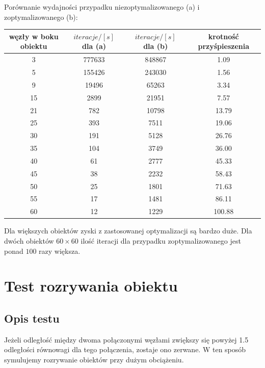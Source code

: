 \documentclass[12pt, letterpaper]{report}
\begin{document}
    Porównanie wydajności przypadku niezoptymalizowanego (a) i zoptymalizowanego (b):
    \begin{center}
        \begin{tabular}{||c c c c||} 
         \hline
         węzły w boku obiektu & $iteracje / [s]$ dla (a) & $iteracje / [s]$ dla (b) & krotność przyśpieszenia \\ [0.5ex] 
         \hline\hline
         3 & 777633 & 848867 & 1.09 \\ 
         \hline
         5 & 155426 & 243030 & 1.56 \\
         \hline
         9 & 19496 & 65263 & 3.34 \\
         \hline
         15 & 2899 & 21951 & 7.57 \\
         \hline
         21 & 782 & 10798 & 13.79 \\
         \hline
         25 & 393 & 7511 & 19.06 \\
         \hline
         30 & 191 & 5128 & 26.76 \\
         \hline
         35 & 104 & 3749 & 36.00 \\
         \hline
         40 & 61 & 2777 & 45.33 \\ 
         \hline
         45 & 38 & 2232 & 58.43 \\ 
         \hline
         50 & 25 & 1801 & 71.63 \\
         \hline
         55 & 17 & 1481 & 86.11 \\ 
         \hline
         60 & 12 & 1229 & 100.88 \\ [1ex] 
         \hline
        \end{tabular}
    \end{center}
    
    Dla większych obiektów zyski z zastosowanej optymalizacji są bardzo duże. Dla dwóch obiektów
    $60 \times 60$ ilość iteracji dla przypadku zoptymalizowanego jest ponad $100$ razy większa.

    \section{Test rozrywania obiektu}
    \subsection{Opis testu}
    Jeżeli odległość między dwoma połączonymi węzłami zwiększy się powyżej 1.5 odległości równowagi dla 
    tego połączenia, zostaje ono zerwane. W ten sposób symulujemy rozrywanie obiektów przy dużym obciążeniu.
\end{document}
